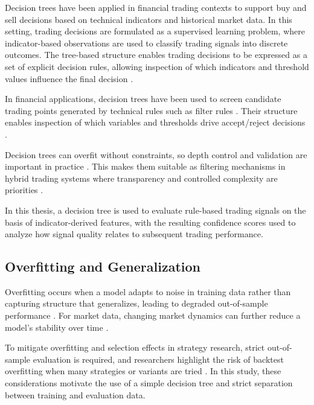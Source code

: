 Decision trees have been applied in financial trading contexts to support
buy and sell decisions based on technical indicators and historical market
data. In this setting, trading decisions are formulated as a supervised learning
problem, where indicator-based observations are used to classify trading
signals into discrete outcomes. The tree-based structure enables trading decisions to be expressed as a
set of explicit decision rules, allowing inspection of which indicators
and threshold values influence the final decision \citep{nugroho2014decision}.

In financial applications, decision trees have been used to screen candidate trading points generated by technical rules such as filter rules \citep{wu2006decisiontree}.
Their structure enables inspection of which variables and thresholds drive accept/reject decisions \citep{wu2006decisiontree, alnasseri2015stocktwits}.

Decision trees can overfit without constraints, so depth control and validation are important in practice \citep{dietterich1995overfitting}.
This makes them suitable as filtering mechanisms in hybrid trading systems where transparency and controlled complexity are priorities \citep{wu2006decisiontree}.

In this thesis, a decision tree is used to evaluate rule-based trading signals on
the basis of indicator-derived features, with the resulting confidence scores used
to analyze how signal quality relates to subsequent trading performance.


\subsection{Overfitting and Generalization}
\label{subsec:overfitting_generalization}

Overfitting occurs when a model adapts to noise in training data rather than capturing structure that generalizes, leading to degraded out-of-sample performance \citep{dietterich1995overfitting, hawkins2004overfitting}.
For market data, changing market dynamics can further reduce a model's stability over time \citep{rechenthin2014ml}.

To mitigate overfitting and selection effects in strategy research, strict out-of-sample evaluation is required, and researchers highlight the risk of backtest overfitting when many strategies or variants are tried \citep{bailey2017pbo}.
In this study, these considerations motivate the use of a simple decision tree and strict separation between training and evaluation data.



